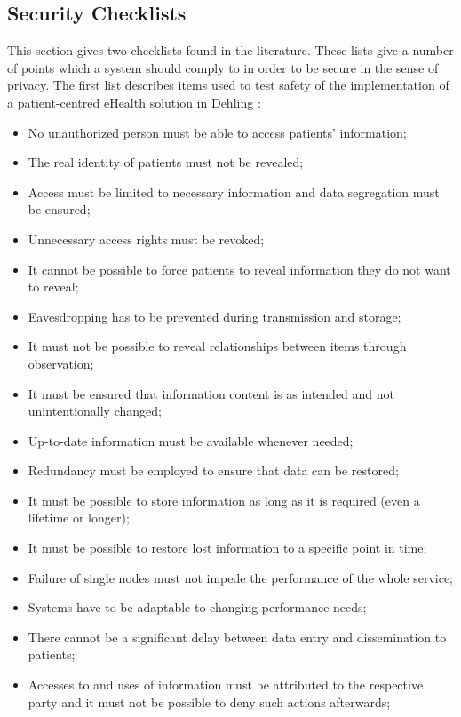 \subsection{Security Checklists}
\label{security-checklists}

This section gives two checklists found in the literature.
These lists give a number of points which a system should comply to in order to be secure in the sense of privacy.
The first list describes items used to test safety of the implementation of a patient-centred eHealth solution in Dehling \cite{s17Dehling2014}:
\begin{itemize}
	\item No unauthorized person must be able to access patients' information;
	\item The real identity of patients must not be revealed;
	\item Access must be limited to necessary information and data segregation must be ensured;
	\item Unnecessary access rights must be revoked;
	\item It cannot be possible to force patients to reveal information they do not want to reveal;
	\item Eavesdropping has to be prevented during transmission and storage;
	\item It must not be possible to reveal relationships between items through observation;
	\item It must be ensured that information content is as intended and not unintentionally changed;
	\item Up-to-date information must be available whenever needed;
	\item Redundancy must be employed to ensure that data can be restored;
	\item It must be possible to store information as long as it is required (even a lifetime or longer);
	\item It must be possible to restore lost information to a specific point in time;
	\item Failure of single nodes must not impede the performance of the whole service;
	\item Systems have to be adaptable to changing performance needs;
	\item There cannot be a significant delay between data entry and dissemination to patients;
	\item Accesses to and uses of information must be attributed to the respective party and it must not be possible to deny such actions afterwards;

\end{itemize}
